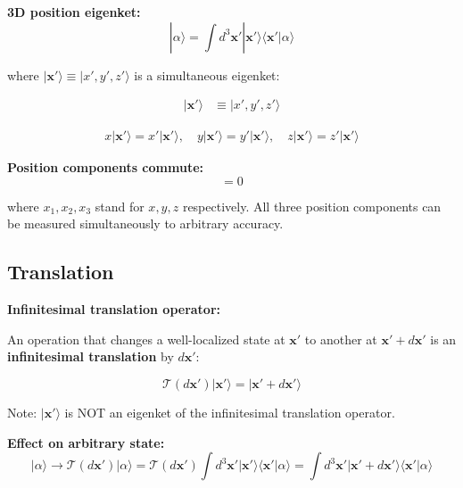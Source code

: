 \documentclass[11pt,a4paper]{article}
\begin{document}
\textbf{3D position eigenket:}
\begin{equation}
|\alpha\rangle = \int d^3\mathbf{x}'|\mathbf{x}'\rangle\langle\mathbf{x}'|\alpha\rangle
\tag{1.191}
\end{equation}

where $|\mathbf{x}'\rangle \equiv |x', y', z'\rangle$ is a simultaneous eigenket:

\begin{align}
|\mathbf{x}'\rangle &\equiv |x', y', z'\rangle \tag{1.192a}
\end{align}

\begin{align}
x|\mathbf{x}'\rangle = x'|\mathbf{x}'\rangle, \quad y|\mathbf{x}'\rangle = y'|\mathbf{x}'\rangle, \quad z|\mathbf{x}'\rangle = z'|\mathbf{x}'\rangle \tag{1.192b}
\end{align}

\textbf{Position components commute:}
\begin{equation}
[x_i, x_j] = 0
\tag{1.193}
\end{equation}

where $x_1, x_2, x_3$ stand for $x, y, z$ respectively. All three position components can be measured simultaneously to arbitrary accuracy.

\subsection{Translation}

\textbf{Infinitesimal translation operator:}

An operation that changes a well-localized state at $\mathbf{x}'$ to another at $\mathbf{x}' + d\mathbf{x}'$ is an \textbf{infinitesimal translation} by $d\mathbf{x}'$:

\begin{equation}
\mathcal{T}(d\mathbf{x}')|\mathbf{x}'\rangle = |\mathbf{x}' + d\mathbf{x}'\rangle
\tag{1.194}
\end{equation}

Note: $|\mathbf{x}'\rangle$ is NOT an eigenket of the infinitesimal translation operator.

\textbf{Effect on arbitrary state:}
\begin{equation}
|\alpha\rangle \to \mathcal{T}(d\mathbf{x}')|\alpha\rangle = \mathcal{T}(d\mathbf{x}') \int d^3\mathbf{x}'|\mathbf{x}'\rangle\langle\mathbf{x}'|\alpha\rangle = \int d^3\mathbf{x}'|\mathbf{x}' + d\mathbf{x}'\rangle\langle\mathbf{x}'|\alpha\rangle
\tag{1.195}
\end{equation}
\end{document}
